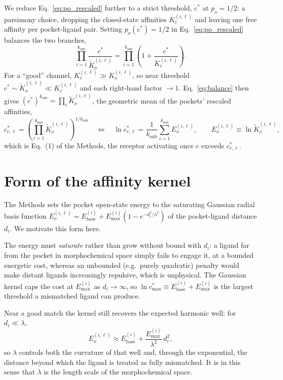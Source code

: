 \documentclass[aps,pre,superscriptaddress,floatfix,longbibliography,linenumbers]{revtex4-2}
\begin{document}
We reduce Eq.~\eqref{eq:po_rescaled} further to a strict threshold, $c^*$ at
$p_o=1/2$: a parsimony choice, dropping the closed-state affinities
$K_c^{(i,\ell)}$ and leaving one free affinity per pocket-ligand pair.
Setting $p_o(c^*)=1/2$ in Eq.~\eqref{eq:po_rescaled} balances the two
branches,
\begin{equation}
\prod_{i=1}^{k_\text{sub}} \frac{c^*}{\tilde K_o^{(i,\ell)}} = \prod_{i=1}^{k_\text{sub}} \left(1+\frac{c^*}{K_c^{(i,\ell)}}\right).
\label{eq:balance}
\end{equation}
For a ``good'' channel, $K_c^{(i,\ell)}\gg K_o^{(i,\ell)}$, so near threshold
$c^*\sim\tilde K_o^{(i,\ell)}\ll K_c^{(i,\ell)}$ and each right-hand factor
$\to1$. Eq.~\eqref{eq:balance} then gives
$(c^*)^{k_\text{sub}}=\prod_i\tilde K_o^{(i,\ell)}$, the geometric mean of the
pockets' rescaled affinities,
\begin{equation}
c^*_{r,\ell} = \left(\prod_{i=1}^{k_\text{sub}} \tilde K_o^{(i,\ell)}\right)^{1/k_\text{sub}}
\quad\Longleftrightarrow\quad
\ln c^*_{r,\ell} = \frac{1}{k_\text{sub}}\sum_{i=1}^{k_\text{sub}} E_o^{(i,\ell)},
\qquad E_o^{(i,\ell)} \equiv \ln\tilde K_o^{(i,\ell)},
\label{eq:ec50}
\end{equation}
which is Eq.~(1) of the Methods, the receptor activating once $c$ exceeds
$c^*_{r,\ell}$.

\section{Form of the affinity kernel}
\label{sec:kernelform}

The Methods sets the pocket open-state energy to the saturating Gaussian
radial basis function
$E_o^{(i,\ell)} = E_\text{base}^{(i)} + E_\text{max}^{(i)}(1-e^{-d_i^2/\lambda^2})$
of the pocket-ligand distance $d_i$. We motivate this form here.

The energy must \emph{saturate} rather than grow without bound with $d_i$: a
ligand far from the pocket in morphochemical space simply fails to engage it,
at a bounded energetic cost, whereas an unbounded (e.g.\ purely quadratic)
penalty would make distant ligands increasingly repulsive, which is
unphysical. The Gaussian kernel caps the cost at $E_\text{max}^{(i)}$ as
$d_i\to\infty$, so $\ln c^*_\text{max}\equiv E_\text{base}^{(i)}+E_\text{max}^{(i)}$
is the largest threshold a mismatched ligand can produce.

Near a good match the kernel still recovers the expected harmonic well: for
$d_i\ll\lambda$,
\begin{equation}
E_o^{(i,\ell)} \approx E_\text{base}^{(i)} + \frac{E_\text{max}^{(i)}}{\lambda^2}\,d_i^2,
\label{eq:harmonic}
\end{equation}
so $\lambda$ controls both the curvature of that well and, through the
exponential, the distance beyond which the ligand is treated as fully
mismatched. It is in this sense that $\lambda$ is the length scale of the
morphochemical space.
\end{document}
